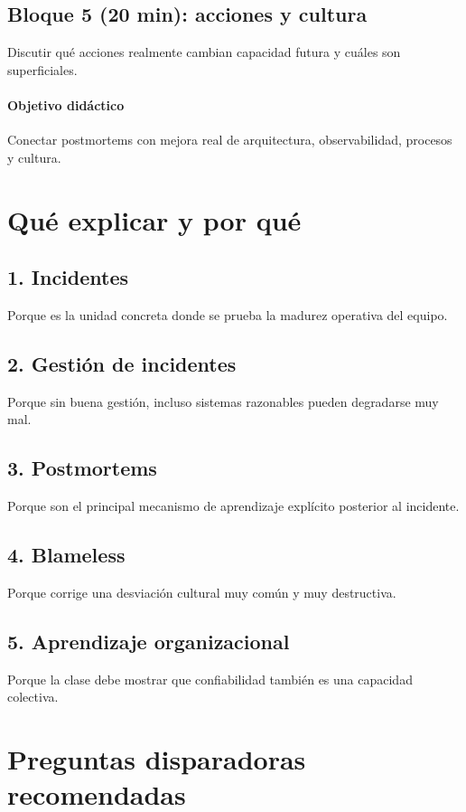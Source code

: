 \documentclass[variant=docente,cover=institutional,mode=screen]{ua-engineering-v6-article}
\begin{document}
\subsection*{Bloque 5 (20 min): acciones y cultura}
Discutir qué acciones realmente cambian capacidad futura y cuáles son superficiales.

\paragraph{Objetivo didáctico}
Conectar postmortems con mejora real de arquitectura, observabilidad, procesos y cultura.

\section{Qué explicar y por qué}

\subsection*{1. Incidentes}
Porque es la unidad concreta donde se prueba la madurez operativa del equipo.

\subsection*{2. Gestión de incidentes}
Porque sin buena gestión, incluso sistemas razonables pueden degradarse muy mal.

\subsection*{3. Postmortems}
Porque son el principal mecanismo de aprendizaje explícito posterior al incidente.

\subsection*{4. Blameless}
Porque corrige una desviación cultural muy común y muy destructiva.

\subsection*{5. Aprendizaje organizacional}
Porque la clase debe mostrar que confiabilidad también es una capacidad colectiva.

\section{Preguntas disparadoras recomendadas}
\end{document}
